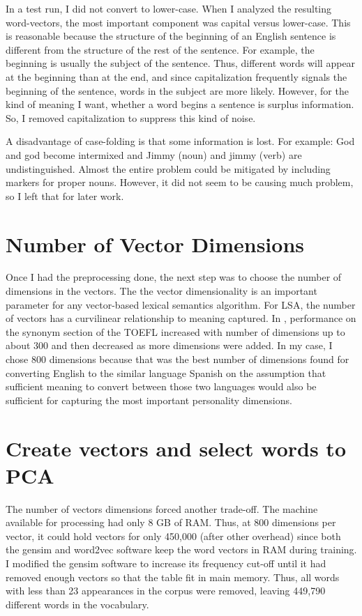 \documentclass[eric_thesis.tex]{subfiles}
\begin{document}
In a test run, I did not convert to lower-case. When I analyzed the resulting 
word-vectors, the most important component was capital versus lower-case. This 
is reasonable because the structure of the beginning of an English sentence is 
different from the structure of the rest of the sentence. For example, the 
beginning is usually the subject of the sentence. Thus, different words will 
appear at the beginning than at the end, and since capitalization frequently 
signals the beginning of the sentence, words in the subject are more likely. 
However, for the kind of meaning I want, whether a word begins a sentence is 
surplus information. So, I removed capitalization to suppress this kind of 
noise.

A disadvantage of case-folding is that some information is lost. For example: 
God and god become intermixed and Jimmy (noun) and jimmy (verb) are 
undistinguished. Almost the entire problem could be mitigated by including 
markers for proper nouns. However, it did not seem to be causing much problem, 
so I left that for later work.

\section{Number of Vector Dimensions}

Once I had the preprocessing done, the next step was to choose the number of 
dimensions in the vectors. The the vector dimensionality is an important 
parameter for any vector-based lexical semantics algorithm. For LSA, the number 
of vectors has a curvilinear relationship to meaning captured. In , performance on the 
synonym section of the TOEFL  increased with number of 
dimensions up to about 300 and then decreased as more dimensions were added. In 
my case, I chose 800 dimensions because that was the best number of dimensions 
found for converting English to the similar language Spanish  on the assumption that sufficient meaning to convert between 
those two languages would also be sufficient for capturing the most important 
personality dimensions.

\section{Create vectors and select words to PCA}

The number of vectors dimensions forced another trade-off. The machine available
for processing had only 8 GB of RAM. Thus, at 800 dimensions per vector, it 
could hold vectors for only 450,000 (after other overhead) since both the 
gensim and word2vec software keep the word vectors in RAM during training. 
I modified the gensim software to increase its frequency cut-off until it had removed enough
vectors so that the table fit in main memory. Thus, all words with less than 
23 appearances in the corpus were removed, leaving 449,790 different words in
the vocabulary.
\end{document}
